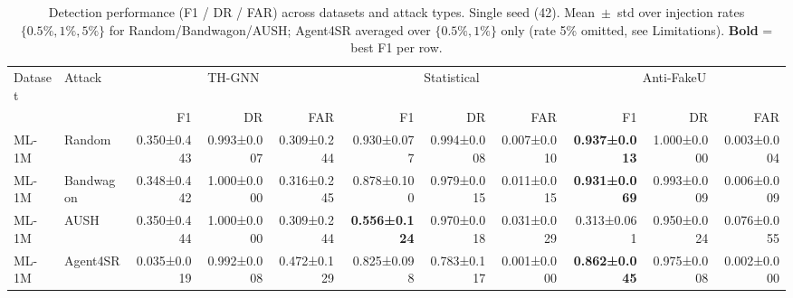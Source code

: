 \begin{table}[t]
\centering
\small
\caption{Detection performance (F1 / DR / FAR) across datasets and attack types. Single seed (42). Mean~$\pm$~std over injection rates $\{0.5\%, 1\%, 5\%\}$ for Random/Bandwagon/AUSH; Agent4SR averaged over $\{0.5\%, 1\%\}$ only (rate 5\% omitted, see Limitations). \textbf{Bold} = best F1 per row.}
\label{tab:main_detection}
\begin{tabular}{llrrrrrrrrr}
\toprule
Dataset & Attack & \multicolumn{3}{c}{TH-GNN} & \multicolumn{3}{c}{Statistical} & \multicolumn{3}{c}{Anti-FakeU} \\
\cmidrule(lr){3-11}
 &  & F1 & DR & FAR & F1 & DR & FAR & F1 & DR & FAR \\
\midrule
ML-1M & Random & 0.350±0.443 & 0.993±0.007 & 0.309±0.244 & 0.930±0.077 & 0.994±0.008 & 0.007±0.010 & \textbf{0.937±0.013} & 1.000±0.000 & 0.003±0.004 \\
ML-1M & Bandwagon & 0.348±0.442 & 1.000±0.000 & 0.316±0.245 & 0.878±0.100 & 0.979±0.015 & 0.011±0.015 & \textbf{0.931±0.069} & 0.993±0.009 & 0.006±0.009 \\
ML-1M & AUSH & 0.350±0.444 & 1.000±0.000 & 0.309±0.244 & \textbf{0.556±0.124} & 0.970±0.018 & 0.031±0.029 & 0.313±0.061 & 0.950±0.024 & 0.076±0.055 \\
ML-1M & Agent4SR & 0.035±0.019 & 0.992±0.008 & 0.472±0.129 & 0.825±0.098 & 0.783±0.117 & 0.001±0.000 & \textbf{0.862±0.045} & 0.975±0.008 & 0.002±0.000 \\
\bottomrule
\end{tabular}
\end{table}